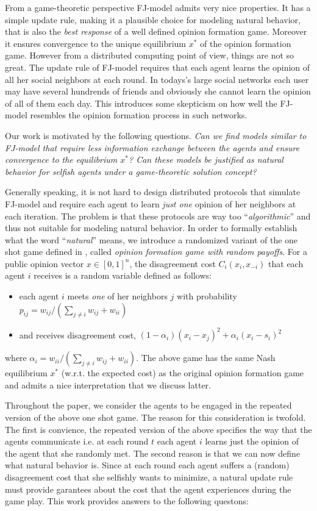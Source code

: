 From a game-theoretic perspective FJ-model admits
very nice properties. It has a simple update rule, making it
a plausible choice for modeling natural behavior, that
is also the \emph{best response} of a well 
defined opinion formation game. Moreover it ensures
convergence to the unique equilibrium $x^*$ of the opinion 
formation game. However from a 
distributed computing point of view, things are not
so great. The update rule of FJ-model requires that each agent learns
the opinion of all her social neighbors at each 
round. In todays's large social networks each user
may have several hundrends of friends and obviously
she cannot learn the opinion of all of them each day.
This introduces some skepticism on how well the 
FJ-model resembles the opinion formation process in such
networks.

Our work is motivated by the following questions.
\emph{
Can we find models similar to FJ-model that 
require less information exchange between the agents
and ensure convergence to the equilibrium $x^*$?
Can these models be justified as natural behavior for selfish
agents under a game-theoretic solution concept?}

Generally speaking, it is not hard to 
design distributed protocols that simulate FJ-model
and require each agent to learn \emph{just one} opinion 
of her neighbors at each iteration. The problem is that these protocols 
are way too \enquote{\emph{algorithmic}} and thus not suitable for modeling 
natural behavior. In order to formally establish what
the word \enquote{\emph{natural}} means, we introduce a randomized 
variant of the one shot game defined in \cite{BKO11},
called \emph{opinion formation game with random payoffs}.
For a public opinion vector $x \in [0,1]^n$, the disagreement 
cost $C_i(x_i,x_{-i})$ that each agent $i$ receives is
a random variable defined as follows:
\begin{itemize}
 \item each agent $i$ meets \emph{one} of her neighbors $j$ with probability
 $p_{ij}=w_{ij}/(\sum_{j\neq i}w_{ij}+w_{ii})$
 \item and receives disagreement cost, $(1-\alpha_i)(x_i-x_j)^2 + \alpha_i(x_i-s_i)^2$ 
\end{itemize}
where $\alpha_i=w_{ii}/(\sum_{j\neq i}w_{ij}+w_{ii})$. The above game
has the same Nash equilibrium $x^*$ (w.r.t. the expected cost) as
the original opinion formation game and admits a nice interpretation
that we discuss latter.

Throughout the paper, we consider the agents to be engaged in the repeated 
version of the above one shot game. The reason for this
consideration is twofold. The first is convience, the repeated
version of the above specifies the way that the agents communicate i.e.
at each round $t$ each agent $i$ learns just the opinion 
of the agent that she randomly met. The second reason is that we can now define 
what natural behavior is. Since at each round each agent
suffers a (random) disagreement cost that she selfishly wants 
to minimize, a natural update rule must provide garantees about
the cost that the agent experiences during the game play.
This work provides answers to the following questons:

